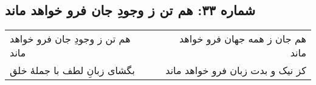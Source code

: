 \begin{center}
\section*{شماره ۳۳: هم تن ز وجودِ جان فرو خواهد ماند}
\label{sec:033}
\begin{longtable}{l p{0.5cm} r}
هم تن ز وجودِ جان فرو خواهد ماند
&&
هم جان ز همه جهان فرو خواهد ماند
\\
بگشای زبانِ لطف با جملهٔ خلق
&&
کز نیک و بدت زبان فرو خواهد ماند
\\
\end{longtable}
\end{center}
